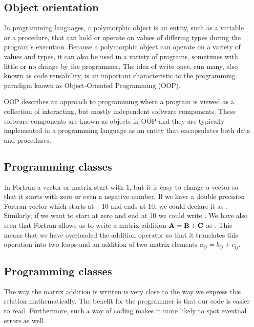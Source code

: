 \documentclass[%
twoside,                 %
final,                   %
10pt]{article}
\begin{document}
{{{{{\noindent
\subsection{Object orientation}

In programming languages, a polymorphic object is an entity, such as a variable or a procedure, that can hold or operate on values of differing types during the program's execution. Because a polymorphic object can operate on a variety of values and types, it can also be used in a variety of programs, sometimes with little or no change by the programmer. The idea of write once, run many, also known as code reusability, is an important characteristic to the programming paradigm known as Object-Oriented Programming (OOP).

OOP describes an approach to programming where a program is viewed as a collection of interacting, but mostly independent software components. These software components are known as objects in OOP and they are typically implemented in a programming language as an entity that encapsulates both data and procedures.

\subsection{Programming classes}

In Fortran a vector or matrix start with $1$, but it is easy
to change a vector so that it starts with zero or even a negative number.
If we have a double precision Fortran vector  which starts at $-10$ and ends at $10$, we could declare it as
. Similarly, if we want to start at zero and end at 10 we could write
.
We have also seen that Fortran  allows us to write a matrix addition ${\bf A} = {\bf B}+{\bf C}$ as
.  This means that we have overloaded the addition operator so that it translates this operation into
two loops and an addition of two matrix elements $a_{ij} = b_{ij}+c_{ij}$.

\subsection{Programming classes}

The way the matrix addition is written is very close to the way we express this relation mathematically. The benefit for the
programmer is that our code is easier to read. Furthermore, such a way of coding makes it  more likely  to spot eventual
errors as well.

}}}}}
\end{document}
